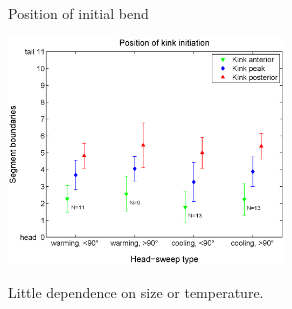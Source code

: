 \documentclass{beamer}%
\newcommand{\Hs}{Head-sweep}
\begin{document}
%
%
%
%
%
%
%

\begin{frame}{Position of initial bend}
%
 \begin{center}
   \includegraphics[height=6cm]{Figs/KinkStart.eps}
 \end{center}

 Little dependence on size or temperature.
%
\end{frame}
\end{document}
